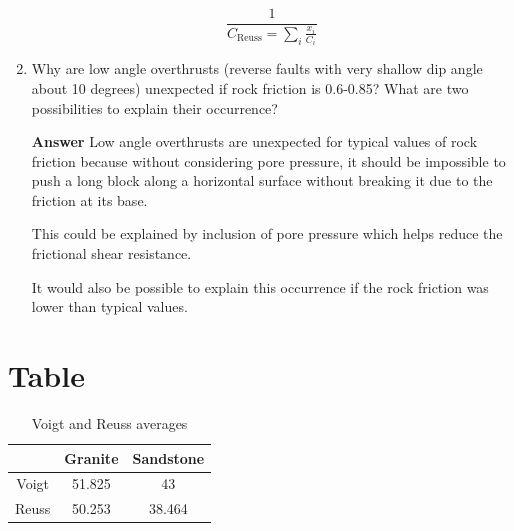 \documentclass{article}
\begin{document}
\begin{enumerate}
\begin{equation}
    \frac{1}{C_{\textrm{Reuss}} = \sum_i \frac{x_i}{C_i}}
\end{equation}

    \item Why are low angle overthrusts (reverse faults with very shallow dip angle about 10 degrees) unexpected if rock friction is 0.6-0.85? What are two possibilities to explain their occurrence?

    \textbf{Answer}
    Low angle overthrusts are unexpected for typical values of rock friction because without considering pore pressure, it should be impossible to push a long block along a horizontal surface without breaking it due to the friction at its base.

    This could be explained by inclusion of pore pressure which helps reduce the frictional shear resistance. 

    It would also be possible to explain this occurrence if the rock friction was lower than typical values.
\end{enumerate}

\pagebreak

\section*{Table}

\begin{table}[h]
\centering
\caption{Voigt and Reuss averages} \label{tab:voigt-reuss-average}
\begin{tabular}{ccc} \toprule
       & Granite & Sandstone \\ \midrule
Voigt & 51.825  & 43        \\ 
Reuss  & 50.253  & 38.464    \\ \bottomrule
\end{tabular}
\end{table}
\end{document}
